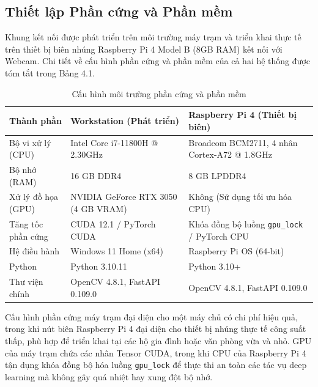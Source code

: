\documentclass[12pt,a4paper]{article}
\begin{document}
\subsection{Thiết lập Phần cứng và Phần mềm}
Khung kết nối được phát triển trên môi trường máy trạm và triển khai thực tế trên thiết bị biên nhúng Raspberry Pi 4 Model B (8GB RAM) kết nối với Webcam. Chi tiết về cấu hình phần cứng và phần mềm của cả hai hệ thống được tóm tắt trong Bảng 4.1.

\begin{table}[h]
    \centering
    \caption{Cấu hình môi trường phần cứng và phần mềm}
    \label{tab:env_config}
    \begin{tabular}{lll}
        \toprule
        \textbf{Thành phần} & \textbf{Workstation (Phát triển)} & \textbf{Raspberry Pi 4 (Thiết bị biên)} \\
        \midrule
        Bộ vi xử lý (CPU) & Intel Core i7-11800H @ 2.30GHz & Broadcom BCM2711, 4 nhân Cortex-A72 @ 1.8GHz \\
        Bộ nhớ (RAM) & 16 GB DDR4 & 8 GB LPDDR4 \\
        Xử lý đồ họa (GPU) & NVIDIA GeForce RTX 3050 (4 GB VRAM) & Không (Sử dụng tối ưu hóa CPU) \\
        Tăng tốc phần cứng & CUDA 12.1 / PyTorch CUDA & Khóa đồng bộ luồng \texttt{gpu\_lock} / PyTorch CPU \\
        Hệ điều hành & Windows 11 Home (x64) & Raspberry Pi OS (64-bit) \\
        Python & Python 3.10.11 & Python 3.10+ \\
        Thư viện chính & OpenCV 4.8.1, FastAPI 0.109.0 & OpenCV 4.8.1, FastAPI 0.109.0 \\
        \bottomrule
    \end{tabular}
\end{table}

Cấu hình phần cứng máy trạm đại diện cho một máy chủ có chi phí hiệu quả, trong khi nút biên Raspberry Pi 4 đại diện cho thiết bị nhúng thực tế công suất thấp, phù hợp để triển khai tại các hộ gia đình hoặc văn phòng vừa và nhỏ. GPU của máy trạm chứa các nhân Tensor CUDA, trong khi CPU của Raspberry Pi 4 tận dụng khóa đồng bộ hóa luồng \texttt{gpu\_lock} để thực thi an toàn các tác vụ deep learning mà không gây quá nhiệt hay xung đột bộ nhớ.
\end{document}
